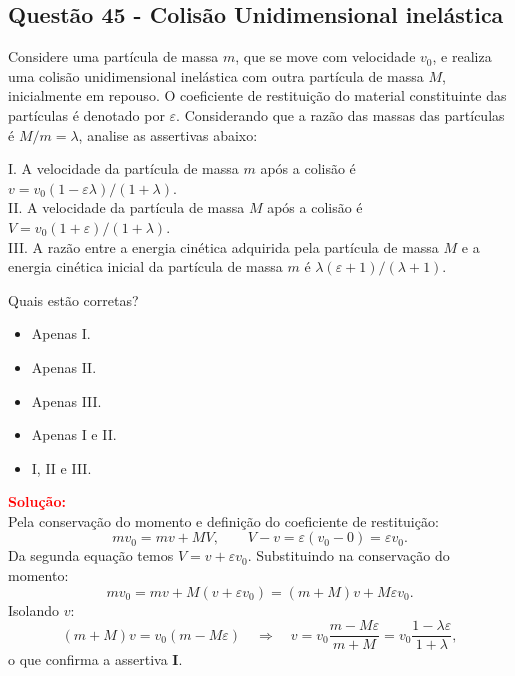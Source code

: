 \documentclass[a4paper,12pt]{article}
\begin{document}
\begin{flushleft}
\subsection{Quest\~ao 45 - Colis\~ao Unidimensional inel\'astica}

Considere uma part\'icula de massa $m$, que se move com velocidade $v_0$, e realiza uma colis\~ao unidimensional inel\'astica com outra part\'icula de massa $M$, inicialmente em repouso. O coeficiente de restitui\c{c}\~ao do material constituinte das part\'iculas \'e denotado por $\varepsilon$. Considerando que a raz\~ao das massas das part\'iculas \'e $M/m=\lambda$, analise as assertivas abaixo:

I. A velocidade da part\'icula de massa $m$ ap\'os a colis\~ao \'e $v=v_0(1-\varepsilon\lambda)/(1+\lambda)$.\\
II. A velocidade da part\'icula de massa $M$ ap\'os a colis\~ao \'e $V=v_0(1+\varepsilon)/(1+\lambda)$.\\
III. A raz\~ao entre a energia cin\'etica adquirida pela part\'icula de massa $M$ e a energia cin\'etica inicial da part\'icula de massa $m$ \'e $\lambda(\varepsilon+1)/(\lambda+1)$.

Quais est\~ao corretas?

\begin{itemize}
\item[(A)] Apenas I.
\item[(B)] Apenas II.
\item[(C)] Apenas III.
\item[(D)] Apenas I e II.
\item[(E)] I, II e III.
\end{itemize}

\vspace{0.5cm}

\textcolor{red}{\textbf{Solução:}}\\

Pela conserva\c{c}\~ao do momento e defini\c{c}\~ao do coeficiente de restitui\c{c}\~ao:
\[
m v_0 = m v + M V,
\qquad
V - v = \varepsilon (v_0-0)=\varepsilon v_0.
\]
Da segunda equa\c{c}\~ao temos $V=v+\varepsilon v_0$. Substituindo na conserva\c{c}\~ao do momento:
\[
m v_0 = m v + M(v+\varepsilon v_0)=(m+M)v + M\varepsilon v_0.
\]
Isolando $v$:
\[
(m+M)v = v_0(m - M\varepsilon)
\quad\Rightarrow\quad
v = v_0\frac{m - M\varepsilon}{m+M}
= v_0\frac{1-\lambda\varepsilon}{1+\lambda},
\]
o que confirma a assertiva \textbf{I}.


\end{flushleft}
\end{document}
